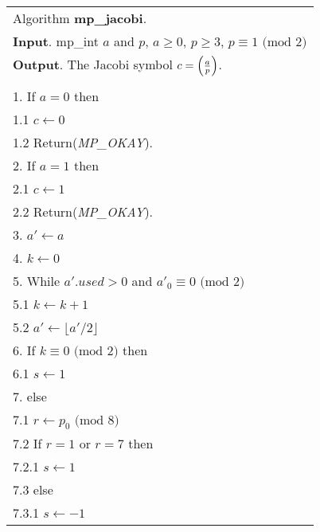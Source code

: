 \documentclass[b5paper]{book}
\begin{document}
\newpage\begin{figure}[!here]
\begin{small}
\begin{center}
\begin{tabular}{l}
\hline Algorithm \textbf{mp\_jacobi}. \\
\textbf{Input}.   mp\_int $a$ and $p$, $a \ge 0$, $p \ge 3$, $p \equiv 1 \mbox{ (mod }2\mbox{)}$ \\
\textbf{Output}.  The Jacobi symbol $c = \left ( {a \over p } \right )$. \\
\hline \\
1.  If $a = 0$ then \\
\hspace{3mm}1.1  $c \leftarrow 0$ \\
\hspace{3mm}1.2  Return(\textit{MP\_OKAY}). \\
2.  If $a = 1$ then \\
\hspace{3mm}2.1  $c \leftarrow 1$ \\
\hspace{3mm}2.2  Return(\textit{MP\_OKAY}). \\
3.  $a' \leftarrow a$ \\
4.  $k \leftarrow 0$ \\
5.  While $a'.used > 0$ and $a'_0 \equiv 0 \mbox{ (mod }2\mbox{)}$ \\
\hspace{3mm}5.1  $k \leftarrow k + 1$ \\
\hspace{3mm}5.2  $a' \leftarrow \lfloor a' / 2 \rfloor$ \\
6.  If $k \equiv 0 \mbox{ (mod }2\mbox{)}$ then \\
\hspace{3mm}6.1  $s \leftarrow 1$ \\
7.  else \\
\hspace{3mm}7.1  $r \leftarrow p_0 \mbox{ (mod }8\mbox{)}$ \\
\hspace{3mm}7.2  If $r = 1$ or $r = 7$ then \\
\hspace{6mm}7.2.1  $s \leftarrow 1$ \\
\hspace{3mm}7.3  else \\
\hspace{6mm}7.3.1  $s \leftarrow -1$ \\

\end{tabular}
\end{center}
\end{small}
\end{figure}
\end{document}
